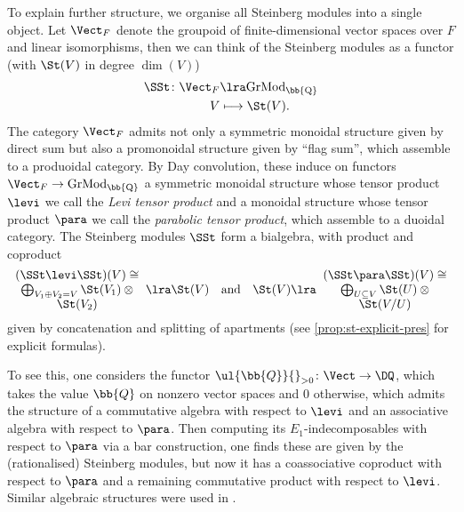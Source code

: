 \documentclass[a4paper]{amsart}
\begin{document}
To explain further structure, we organise all Steinberg modules into a single object. Let $\Vect_F$ denote the groupoid of finite-dimensional vector spaces over $F$ and linear isomorphisms, then we can think of the Steinberg modules as a functor (with $\St(V)$ in degree $\dim(V)$)
\begin{align*}\SSt \colon \Vect_F &\lra \rm{GrMod}_\bb{Q} \\
V &\longmapsto \St(V).\end{align*}
The category $\Vect_F$ admits not only a symmetric monoidal structure given by direct sum but also a promonoidal structure given by ``flag sum'', which assemble to a produoidal category. By Day convolution, these induce on functors $\Vect_F \to \rm{GrMod}_\bb{Q}$ a symmetric monoidal structure whose tensor product $\levi$ we call the \emph{Levi tensor  product} and a monoidal structure whose tensor product $\para$ we call the \emph{parabolic tensor product}, which assemble to a duoidal category. The Steinberg modules $\SSt$ form a bialgebra, with product and coproduct
\[\parbox{4cm}{\centering $(\SSt \levi \SSt)(V) \cong$ \\
$\bigoplus_{V_1 \oplus V_2 = V} \St(V_1) \otimes \St(V_2)$} \lra \St(V) \quad \text{and} \quad \St(V) \lra \parbox{4cm}{\centering $(\SSt \para \SSt)(V) \cong $ \\ 
$\bigoplus_{U \subseteq V} \St(U) \otimes \St(V/U)$}\]
given by concatenation and splitting of apartments (see \cref{prop:st-explicit-pres} for explicit formulas).

To see this, one considers the functor $\ul{\bb{Q}}{}_{>0} \colon \Vect \to \DQ$, which takes the value $\bb{Q}$ on nonzero vector spaces and $0$ otherwise, which admits the structure of a commutative algebra with respect to $\levi$ and an associative algebra with respect to $\para$. Then computing its $E_1$-indecomposables with respect to $\para$ via a bar construction, one finds these are given by the (rationalised) Steinberg modules, but now it has a coassociative coproduct with respect to $\para$ and a remaining commutative product with respect to $\levi$. Similar algebraic structures were used in \cite{AMP,BCGP}.
\end{document}
